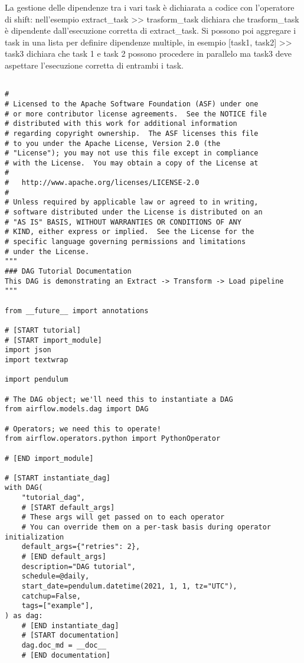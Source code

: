 \documentclass[a4paper,12pt]{report}
\begin{document}
La gestione delle dipendenze tra i vari task è dichiarata a codice con l’operatore di shift: nell’esempio extract\_task >> trasform\_task dichiara che trasform\_task è dipendente dall’esecuzione corretta di extract\_task. Si possono poi aggregare i task in una lista per definire dipendenze multiple, in esempio [task1, task2] >> task3 dichiara che task 1 e task 2 possono procedere in parallelo ma task3 deve aspettare l’esecuzione corretta di entrambi i task.
\begin{verbatim}

#
# Licensed to the Apache Software Foundation (ASF) under one
# or more contributor license agreements.  See the NOTICE file
# distributed with this work for additional information
# regarding copyright ownership.  The ASF licenses this file
# to you under the Apache License, Version 2.0 (the
# "License"); you may not use this file except in compliance
# with the License.  You may obtain a copy of the License at
#
#   http://www.apache.org/licenses/LICENSE-2.0
#
# Unless required by applicable law or agreed to in writing,
# software distributed under the License is distributed on an
# "AS IS" BASIS, WITHOUT WARRANTIES OR CONDITIONS OF ANY
# KIND, either express or implied.  See the License for the
# specific language governing permissions and limitations
# under the License.
"""
### DAG Tutorial Documentation
This DAG is demonstrating an Extract -> Transform -> Load pipeline
"""

from __future__ import annotations

# [START tutorial]
# [START import_module]
import json
import textwrap

import pendulum

# The DAG object; we'll need this to instantiate a DAG
from airflow.models.dag import DAG

# Operators; we need this to operate!
from airflow.operators.python import PythonOperator

# [END import_module]

# [START instantiate_dag]
with DAG(
    "tutorial_dag",
    # [START default_args]
    # These args will get passed on to each operator
    # You can override them on a per-task basis during operator initialization
    default_args={"retries": 2},
    # [END default_args]
    description="DAG tutorial",
    schedule=@daily,
    start_date=pendulum.datetime(2021, 1, 1, tz="UTC"),
    catchup=False,
    tags=["example"],
) as dag:
    # [END instantiate_dag]
    # [START documentation]
    dag.doc_md = __doc__
    # [END documentation]


\end{verbatim}
\end{document}
